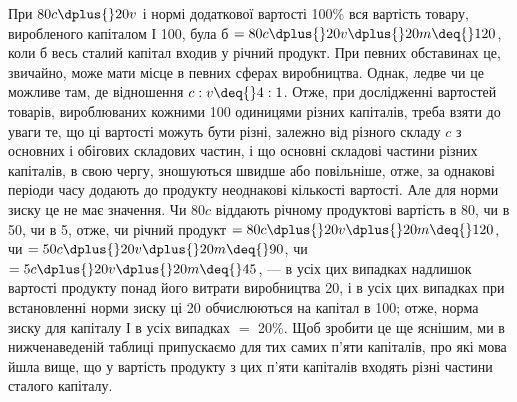 При $80 c \dplus{} 20 v$ і нормі додаткової вартості \deq{} 100\% вся вартість товару, виробленого капіталом І \deq{}
100, була б $= 80 c \dplus{} 20 v \dplus{} 20 m \deq{} 120$, коли б весь сталий капітал входив у річний продукт. При
певних обставинах це, звичайно, може мати місце
в певних сферах виробництва. Однак, ледве чи це можливе там,
де відношення $c : v \deq{} 4 : 1$. Отже, при дослідженні вартостей товарів, вироблюваних кожними 100
одиницями різних капіталів,
треба взяти до уваги те, що ці вартості можуть бути різні, залежно від різного складу $c$ з основних і
обігових складових
частин, і що основні складові частини різних капіталів, в свою
чергу, зношуються швидше або повільніше, отже, за однакові
періоди часу додають до продукту неоднакові кількості вартості. Але для норми зиску це не має
значення. Чи $80 c$ віддають
річному продуктові вартість в 80, чи в 50, чи в 5, отже, чи річний
продукт $= 80 c \dplus{} 20 v \dplus{} 20 m \deq{} 120$, чи $= 50 c \dplus{} 20 v \dplus{} 20 m \deq{} 90$, чи $= 5 c \dplus{} 20 v \dplus{} 20 m \deq{} 45$, — в
усіх цих випадках надлишок
вартості продукту понад його витрати виробництва \deq{} 20, і в усіх
цих випадках при встановленні норми зиску ці 20 обчислюються
на капітал в 100; отже, норма зиску для капіталу І в усіх випадках $=$ 20\%. Щоб зробити це ще яснішим,
ми в нижченаведеній
таблиці припускаємо для тих самих п’яти капіталів, про які мова
йшла вище, що у вартість продукту з цих п’яти капіталів входять різні частини сталого капіталу.
